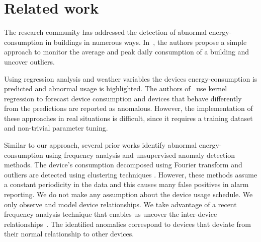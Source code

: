 \section{Related work}
The research community has addressed the detection of abnormal energy-consumption in buildings in numerous ways.
% 
In~\cite{seem:energybldg2007}, the authors propose a simple approach to monitor the average and peak daily consumption of a building and uncover outliers.

Using regression analysis and weather variables the devices energy-consumption is predicted and abnormal usage is highlighted.
The authors of~\cite{brown:buildperf2012} use kernel regression to forecast device consumption and devices that behave differently 
from the predictions are reported as anomalous.
However, the implementation of these approaches in real situations is difficult, since it requires a training dataset and non-trivial 
parameter tuning.

Similar to our approach, several prior works identify abnormal energy-consumption using frequency analysis and unsupervised anomaly detection methods.
The device's consumption decomposed using Fourier transform and outliers are detected using clustering 
techniques \cite{Bellala_buildsys11,wrinch:pes2012,chen:aaaiw2011}. %
However, these methods assume a constant periodicity in the data and this causes many false positives in alarm reporting.  %
We do not make any assumption about the device usage schedule.  We only observe and model device relationships.
We take advantage of a recent frequency analysis technique that enables us uncover the inter-device relationships~\cite{romain:iotapp12}.
The identified anomalies correspond to devices that deviate from their normal relationship to other devices.


